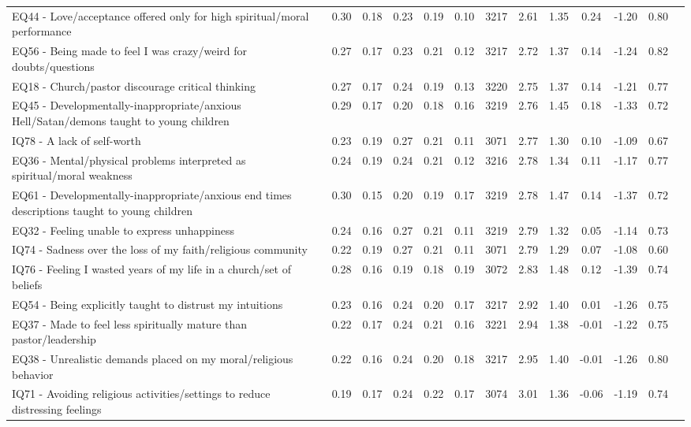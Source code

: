 \documentclass[
  letterpaper,
  DIV=11,
  numbers=noendperiod]{scrreport}
\begin{document}
\begin{longtable}[t]{>{\raggedright\arraybackslash}p{2cm}cccccccccccc}
EQ44 - Love/acceptance offered only for high spiritual/moral performance & 0.30 & 0.18 & 0.23 & 0.19 & 0.10 & 3217 & 2.61 & 1.35 & 0.24 & -1.20 & 0.80 & \\
\addlinespace
EQ56 - Being made to feel I was crazy/weird for doubts/questions & 0.27 & 0.17 & 0.23 & 0.21 & 0.12 & 3217 & 2.72 & 1.37 & 0.14 & -1.24 & 0.82 & \\
EQ18 - Church/pastor discourage critical thinking & 0.27 & 0.17 & 0.24 & 0.19 & 0.13 & 3220 & 2.75 & 1.37 & 0.14 & -1.21 & 0.77 & \\
EQ45 - Developmentally-inappropriate/anxious Hell/Satan/demons taught to young children & 0.29 & 0.17 & 0.20 & 0.18 & 0.16 & 3219 & 2.76 & 1.45 & 0.18 & -1.33 & 0.72 & \\
IQ78 - A lack of self-worth & 0.23 & 0.19 & 0.27 & 0.21 & 0.11 & 3071 & 2.77 & 1.30 & 0.10 & -1.09 & 0.67 & \\
EQ36 - Mental/physical problems interpreted as spiritual/moral weakness & 0.24 & 0.19 & 0.24 & 0.21 & 0.12 & 3216 & 2.78 & 1.34 & 0.11 & -1.17 & 0.77 & \\
\addlinespace
EQ61 - Developmentally-inappropriate/anxious end times descriptions taught to young children & 0.30 & 0.15 & 0.20 & 0.19 & 0.17 & 3219 & 2.78 & 1.47 & 0.14 & -1.37 & 0.72 & \\
EQ32 - Feeling unable to express unhappiness & 0.24 & 0.16 & 0.27 & 0.21 & 0.11 & 3219 & 2.79 & 1.32 & 0.05 & -1.14 & 0.73 & \\
IQ74 - Sadness over the loss of my faith/religious community & 0.22 & 0.19 & 0.27 & 0.21 & 0.11 & 3071 & 2.79 & 1.29 & 0.07 & -1.08 & 0.60 & \\
IQ76 - Feeling I wasted years of my life in a church/set of beliefs & 0.28 & 0.16 & 0.19 & 0.18 & 0.19 & 3072 & 2.83 & 1.48 & 0.12 & -1.39 & 0.74 & \\
EQ54 - Being explicitly taught to distrust my intuitions & 0.23 & 0.16 & 0.24 & 0.20 & 0.17 & 3217 & 2.92 & 1.40 & 0.01 & -1.26 & 0.75 & \\
\addlinespace
EQ37 - Made to feel less spiritually mature than pastor/leadership & 0.22 & 0.17 & 0.24 & 0.21 & 0.16 & 3221 & 2.94 & 1.38 & -0.01 & -1.22 & 0.75 & \\
EQ38 - Unrealistic demands placed on my moral/religious behavior & 0.22 & 0.16 & 0.24 & 0.20 & 0.18 & 3217 & 2.95 & 1.40 & -0.01 & -1.26 & 0.80 & \\
IQ71 - Avoiding religious activities/settings to reduce distressing feelings & 0.19 & 0.17 & 0.24 & 0.22 & 0.17 & 3074 & 3.01 & 1.36 & -0.06 & -1.19 & 0.74 & \\

\end{longtable}
\end{document}
